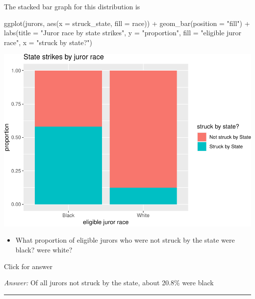 \documentclass[
]{book}
\newenvironment{Shaded}{\begin{snugshade}}{\end{snugshade}}
\newcommand{\AttributeTok}[1]{\textcolor[rgb]{0.77,0.63,0.00}{#1}}
\newcommand{\FunctionTok}[1]{\textcolor[rgb]{0.00,0.00,0.00}{#1}}
\newcommand{\NormalTok}[1]{#1}
\newcommand{\SpecialCharTok}[1]{\textcolor[rgb]{0.00,0.00,0.00}{#1}}
\newcommand{\StringTok}[1]{\textcolor[rgb]{0.31,0.60,0.02}{#1}}
\providecommand{\tightlist}{%
  \setlength{\itemsep}{0pt}\setlength{\parskip}{0pt}}
\begin{document}
The stacked bar graph for this distribution is

\begin{Shaded}
\begin{Highlighting}[]
\FunctionTok{ggplot}\NormalTok{(jurors, }\FunctionTok{aes}\NormalTok{(}\AttributeTok{x =}\NormalTok{ struck\_state, }\AttributeTok{fill =}\NormalTok{ race)) }\SpecialCharTok{+} 
  \FunctionTok{geom\_bar}\NormalTok{(}\AttributeTok{position =} \StringTok{"fill"}\NormalTok{) }\SpecialCharTok{+} 
  \FunctionTok{labs}\NormalTok{(}\AttributeTok{title =} \StringTok{"Juror race by state strikes"}\NormalTok{, }\AttributeTok{y =} \StringTok{"proportion"}\NormalTok{, }
       \AttributeTok{fill =} \StringTok{"eligible juror race"}\NormalTok{, }\AttributeTok{x =} \StringTok{"struck by state?"}\NormalTok{)}
\end{Highlighting}
\end{Shaded}

\includegraphics[width=1\linewidth]{Class_Activity_4_files/figure-latex/unnamed-chunk-15-1}

\begin{itemize}
\tightlist
\item
  What proportion of eligible jurors who were not struck by the state were black? were white?
\end{itemize}

Click for answer

\emph{Answer:} Of all jurors not struck by the state, about 20.8\% were black

\begin{center}\rule{0.5\linewidth}{0.5pt}\end{center}
\end{document}
